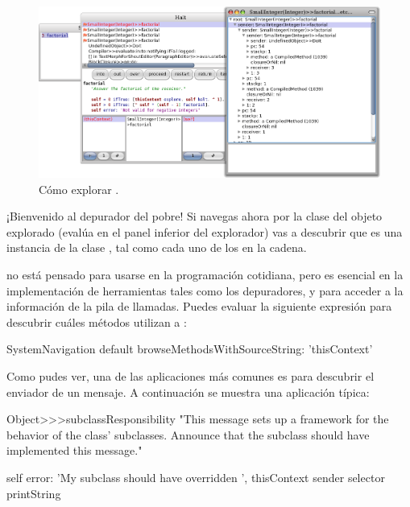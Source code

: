 \documentclass[a4paper,10pt,twoside]{book}
\begin{document}

\begin{figure}[ht]\centering
        \includegraphics[width=\linewidth]{exploringThisContext}
        \caption{ Cómo explorar
          .}
\end{figure}

¡Bienvenido al depurador del pobre!
Si navegas ahora por la clase del objeto explorado (evalúa 
en el panel inferior del explorador) vas a descubrir que es
una instancia de la clase , tal como cada uno de
los  en la cadena.


 no está pensado para usarse en la programación
cotidiana, pero es esencial en la implementación de herramientas tales
como los depuradores, y para acceder a la información de la pila de
llamadas.  Puedes evaluar la siguiente expresión para descubrir cuáles
métodos utilizan a :

\begin{code}{}
SystemNavigation default browseMethodsWithSourceString: 'thisContext'
\end{code}

Como pudes ver, una de las aplicaciones más comunes es para descubrir
el enviador de un mensaje.  A continuación se muestra una aplicación
típica:
\begin{code}{}
Object>>>subclassResponsibility
        "This message sets up a framework for the behavior of the class' subclasses.
        Announce that the subclass should have implemented this message."

        self error: 'My subclass should have overridden ', thisContext sender selector printString
\end{code}
\end{document}
